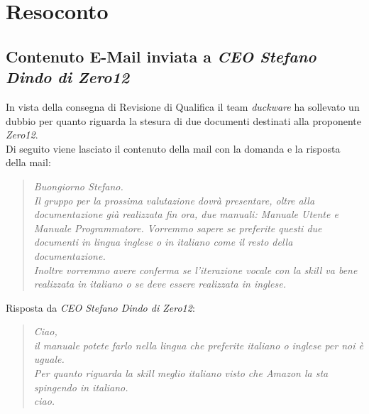 \clearpage
\section{Resoconto}
	\subsection{Contenuto E-Mail inviata a \emph{CEO Stefano Dindo di Zero12}}
	\label{sec:contenuto}
	In vista della consegna di Revisione di Qualifica il team \textit{duckware} ha sollevato un dubbio per quanto riguarda la stesura di due documenti destinati alla proponente \textit{Zero12}.\\
	Di seguito viene lasciato il contenuto della mail con la domanda e la risposta della mail:
	\begin{quote}
		\emph{Buongiorno Stefano.\\[0.25cm]Il gruppo per la prossima valutazione dovrà presentare, oltre alla documentazione già realizzata fin ora, due manuali: Manuale Utente e Manuale Programmatore. Vorremmo sapere se preferite questi due documenti in lingua inglese o in italiano come il resto della documentazione.\\[0.25cm]Inoltre vorremmo avere conferma se l'iterazione vocale con la skill va bene realizzata in italiano o se deve essere realizzata in inglese.
		}
	\end{quote}
	Risposta da \emph{CEO Stefano Dindo di Zero12}:
	\begin{quote}
		\emph{Ciao,\\il manuale potete farlo nella lingua che preferite italiano o inglese per noi è uguale.\\[0.25cm]Per quanto riguarda la skill meglio italiano visto che Amazon la sta spingendo in italiano.\\[0.25cm]ciao.
		}
	\end{quote}
	\pagebreak

